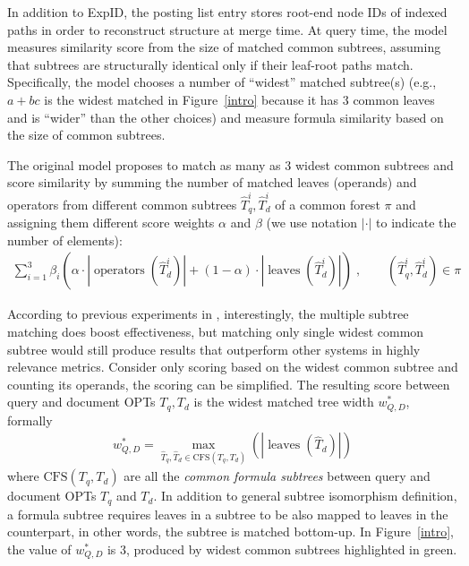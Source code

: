 \documentclass[runningheads]{llncs}
\begin{document}
In addition to ExpID, the posting list entry stores root-end node IDs of indexed paths in order to reconstruct structure at merge time.
At query time, the model measures similarity score from the size of matched common subtrees, assuming that subtrees are structurally identical only if their leaf-root paths match.
%
Specifically, the model chooses a number of ``widest'' matched subtree(s) (e.g., $a+bc$ is the widest matched in Figure~\ref{intro} because it has 3 common leaves and is ``wider'' than the other choices) and measure formula similarity based on the size of common subtrees.

The original model proposes to match as many as 3 widest common subtrees and score similarity by summing the number of matched leaves (operands) and operators from different common subtrees $\hat{T}_q^i, \hat{T}_d^i$ of a common forest $\pi$ and assigning them different score weights $\alpha$ and $\beta$ (we use notation $|\cdot|$ to indicate the number of elements):
\begin{align}
\label{eq:1}
\sum^3_{i=1} \beta_i \left( \alpha \cdot \left|\operatorname{operators}(\hat{T}_d^i)\right| + (1 - \alpha) \cdot \left|\operatorname{leaves}(\hat{T}_d^i)\right| \right)\;, \qquad (\hat{T}_q^i, \hat{T}_d^i) \in \pi
\end{align}

%
According to previous experiments in \cite{a0_2019}, interestingly, the multiple subtree matching does boost effectiveness, but matching only single widest common subtree would still produce results that outperform other systems in highly relevance metrics.
%
Consider only scoring based on the widest common subtree and counting its operands, the scoring can be simplified. The resulting score between query and document OPTs $T_q, T_d$ is the widest matched tree width $w^*_{Q, D}$, formally
\begin{align}
\label{eq:2}
w^*_{Q, D} = \max_{\hat{T}_q, \hat{T}_d \in \text{CFS}(T_q,T_d)}(|\operatorname{leaves}(\hat{T}_d)|)
\end{align}
where
$\text{CFS}(T_q, T_d)$ are all the \textit{common formula subtrees} between query and document OPTs $T_q$ and $T_d$.
In addition to general subtree isomorphism definition, a formula subtree requires leaves in a subtree to be also mapped to leaves in the counterpart, in other words, the subtree is matched bottom-up.
%
In Figure~\ref{intro}, the value of $w^*_{Q, D}$ is 3, produced by widest common subtrees highlighted in green.
\end{document}

